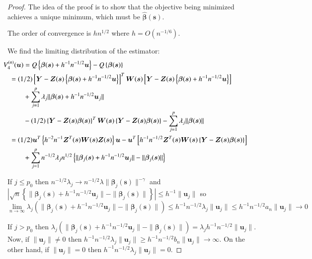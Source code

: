 \documentclass[authoryear, review, 11pt]{elsarticle}
\begin{document}
    \begin{proof}
        The idea of the proof is to show that the objective being minimized achieves a unique minimum, which must be $\hat{\bm{\beta}}(\bm{s})$.
    
        The order of convergence is $h n^{1/2}$ where $h = O(n^{-1/6})$.
    
        We find the limiting distribution of the estimator:
        \begin{align}\label{eq:consistency}
            \mkern-36mu V_4^{(n)}(\bm{u}) &= Q \left\{ \bm{\beta} (\bm{s}) + h^{-1} n^{-1/2} \bm{u} \right\} - Q \left\{ \bm{\beta}(\bm{s}) \right\} \notag \\
            &\mkern-36mu= (1/2) \left[ \bm{Y} - \bm{Z}(\bm{s}) \left\{ \bm{\beta}(\bm{s}) + h^{-1} n^{-1/2} \bm{u} \right\} \right]^T \bm{W}(\bm{s}) \left[ \bm{Y} - \bm{Z}(\bm{s}) \left\{ \bm{\beta}(\bm{s}) + h^{-1} n^{-1/2} \bm{u} \right\} \right] \notag \\
            &+ \sum_{j=1}^p \lambda_j \| \bm{\beta}(\bm{s}) + h^{-1} n^{-1/2} \bm{u}_j \| \notag \\
            &- (1/2) \left\{ \bm{Y} - \bm{Z}(\bm{s}) \bm{\beta}(\bm{s}) \right\}^T \bm{W}(\bm{s}) \left\{ \bm{Y} - \bm{Z}(\bm{s}) \bm{\beta}(\bm{s}) \right\} - \sum_{j=1}^p \lambda_j \| \bm{\beta}(\bm{s}) \| \notag \\ 
            &\mkern-36mu= (1/2) \bm{u}^T \left\{ h^{-2} n^{-1} \bm{Z}^T(\bm{s}) \bm{W}(\bm{s}) \bm{Z}(\bm{s}) \right\} \bm{u} - \bm{u}^T \left[ h^{-1} n^{-1/2} \bm{Z}^T(\bm{s}) \bm{W}(\bm{s}) \left\{ \bm{Y} - \bm{Z}(\bm{s}) \bm{\beta}(\bm{s}) \right\} \right] \notag \\
            &+ \sum_{j=1}^p n^{-1/2} \lambda_j n^{1/2} \left\{ \|\bm{\beta}_j(\bm{s}) + h^{-1} n^{-1/2} \bm{u}_j \| - \| \bm{\beta}_j(\bm{s}) \| \right\}
        \end{align}
        
        If $j \le p_0$ then $n^{-1/2} \lambda_j \to n^{-1/2} \lambda \| \bm{\beta}_j(\bm{s}) \|^{-\gamma}$ and $| \sqrt{n} \left\{ \|\bm{\beta}_j(\bm{s}) + h^{-1} n^{-1/2} \bm{u}_j \| - \| \bm{\beta}_j(\bm{s}) \| \right\} | \le h^{-1} \| \bm{u}_j \|$ so $\lim \limits_{n \to \infty} \lambda_j \left( \|\bm{\beta}_j(\bm{s}) + h^{-1} n^{-1/2} \bm{u}_j \| - \| \bm{\beta}_j(\bm{s}) \| \right) \le h^{-1} n^{-1/2} \lambda_j  \| \bm{u}_j \| \le h^{-1} n^{-1/2} a_n \| \bm{u}_j \| \to 0$

        If $j > p_0$ then $\lambda_j \left( \|\bm{\beta}_j(\bm{s}) + h^{-1} n^{-1/2} \bm{u}_j \| - \| \bm{\beta}_j(\bm{s}) \| \right) = \lambda_j h^{-1} n^{-1/2} \| \bm{u}_j \| $. Now, if $\| \bm{u}_j \| \ne 0$ then $h^{-1} n^{-1/2} \lambda_j \| \bm{u}_j \| \ge h^{-1} n^{-1/2} b_n \| \bm{u}_j \| \to \infty$. On the other hand, if $\| \bm{u}_j \| = 0$ then $h^{-1} n^{-1/2} \lambda_j \| \bm{u}_j \| = 0$.


\end{proof}
\end{document}
